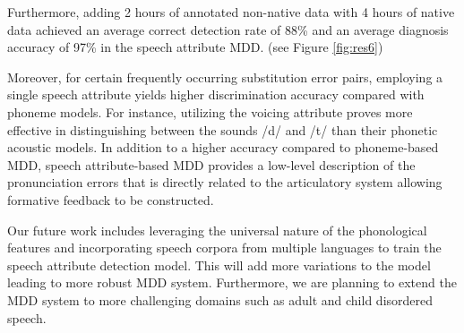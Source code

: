 \documentclass[12pt]{elsarticle}
\begin{document}
Furthermore, adding 2 hours of annotated non-native data with 4 hours of native data achieved an average correct detection rate of 88\% and an average diagnosis accuracy of 97\% in the speech attribute MDD. (see Figure \ref{fig:res6})

Moreover, for certain frequently occurring substitution error pairs, employing a single speech attribute yields higher discrimination accuracy compared with phoneme models. For instance, utilizing the voicing attribute proves more effective in distinguishing between the sounds /d/ and /t/ than their phonetic acoustic models.
In addition to a higher accuracy compared to phoneme-based MDD, speech attribute-based MDD provides a low-level description of the pronunciation errors that is directly related to the articulatory system allowing formative feedback to be constructed.

Our future work includes leveraging the universal nature of the phonological features and incorporating speech corpora from multiple languages to train the speech attribute detection model. This will add more variations to the model leading to more robust MDD system. Furthermore, we are planning to extend the MDD system to more challenging domains such as adult and child disordered speech.

\clearpage


\clearpage


\end{document}
